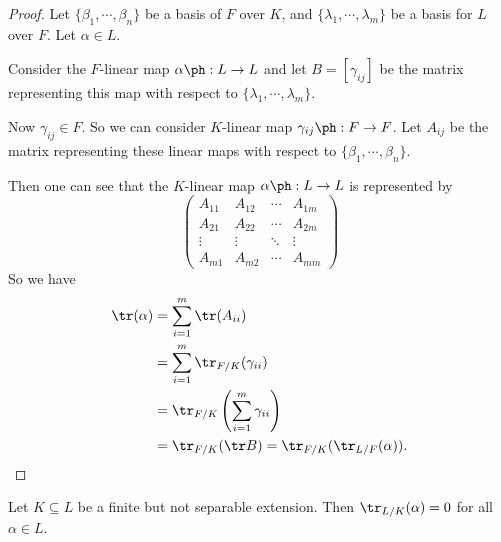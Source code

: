 \documentclass[a4paper]{article}
\begin{document}
\begin{proof}
  Let $\{\beta_1, \cdots, \beta_n\}$ be a basis of $F$ over $K$, and $\{\lambda_1, \cdots, \lambda_m\}$ be a basis for $L$ over $F$. Let $\alpha \in L$.

  Consider the $F$-linear map $\alpha\ph: L \to L$ and let $B = [\gamma_{ij}]$ be the matrix representing this map with respect to $\{\lambda_1, \cdots,\lambda_m\}$.

  Now $\gamma_{ij} \in F$. So we can consider $K$-linear map $\gamma_{ij}\ph: F \to F$. Let $A_{ij}$ be the matrix representing these linear maps with respect to $\{\beta_1, \cdots, \beta_n\}$.

  Then one can see that the $K$-linear map $\alpha\ph: L \to L$ is represented by
  \[
    \begin{pmatrix}
      A_{11} & A_{12} & \cdots & A_{1m}\\
      A_{21} & A_{22} & \cdots & A_{2m}\\
      \vdots & \vdots & \ddots & \vdots\\
      A_{m1} & A_{m2} & \cdots & A_{mm}
    \end{pmatrix}
  \]
  So we have
  \begin{align*}
    \tr(\alpha) &= \sum_{i = 1}^m \tr (A_{ii}) \\
    &= \sum_{i = 1}^m \tr_{F/K} (\gamma_{ii}) \\
    &= \tr_{F/K} \left(\sum_{i = 1}^m \gamma_{ii}\right) \\
    &= \tr_{F/K} (\tr B) = \tr_{F/K}(\tr_{L/F}(\alpha)).
  \end{align*}
\end{proof}

\begin{thm}
  Let $K\subseteq L$ be a finite but not separable extension. Then $\tr_{L/K}(\alpha) = 0$ for all $\alpha \in L$.
\end{thm}
\end{document}
